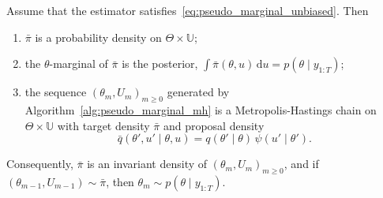 \begin{theorem}
    \label{thm:pseudo_marginal_exact}
    Assume that the estimator satisfies~\eqref{eq:pseudo_marginal_unbiased}. Then
    \begin{enumerate}
        \item $\bar{\pi}$ is a probability density on $\Theta\times\mathbb{U}$;
        \item the $\theta$-marginal of $\bar{\pi}$ is the posterior, $\int \bar{\pi}(\theta,u)\,\mathrm{d}u = p(\theta\mid y_{1:T})$;
        \item the sequence $(\theta_m,U_m)_{m\ge 0}$ generated by Algorithm~\ref{alg:pseudo_marginal_mh} is a Metropolis-Hastings chain on $\Theta\times\mathbb{U}$ with target density $\bar{\pi}$ and proposal density
        \begin{equation}
            \bar{q}(\theta',u'\mid\theta,u) = q(\theta'\mid\theta)\,\psi(u'\mid\theta').
            \label{eq:extended_proposal}
        \end{equation}
    \end{enumerate}
    Consequently, $\bar{\pi}$ is an invariant density of $(\theta_m,U_m)_{m\ge0}$, and if $(\theta_{m-1},U_{m-1})\sim\bar{\pi}$, then $\theta_m\sim p(\theta\mid y_{1:T})$.
\end{theorem}
